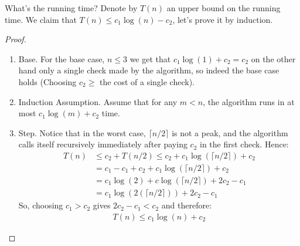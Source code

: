What's the running time? Denote by $T\left( n \right)$ an upper bound on the running time. We claim that $T(n) \le c_{1} \log (n) - c_{2}$, let's prove it by induction.
\begin{proof}
     
\begin{enumerate}
  \item Base. For the base case, $n \le 3$ we get that $c_{1} \log(1) + c_{2} =  c_{2}$ on the other hand only a single check made by the algorithm, so indeed the base case holds (Choosing $c_{2} \ge$ the cost of a single check).
  \item Induction Assumption. Assume that for any $m < n$, the algorithm runs in at most $c_{1} \log(m) + c_{2}$ time.
  \item Step. Notice that in the worst case, $\lceil n/2 \rceil$ is not a peak, and the algorithm calls itself recursively immediately after paying $c_{2}$ in the first check. Hence: \begin{equation*}
      \begin{split}    
	T\left(n\right) & \le c_{2} + T\left(n/2\right) \le c_{2} + c_{1} \log\left( \lceil n/2 \rceil \right) + c_{2}\\
	& = c_{1} - c_{1} + c_{2} + c_{1} \log\left( \lceil n/2 \rceil \right) + c_{2}\\
	& = c_{1} \log (2) +  c \log\left( \lceil n/2 \rceil  \right) + 2c_{2} - c_{1} \\
	& = c_{1} \log\left(2 \left(\lceil n/2 \rceil \right) \right) + 2c_{2} - c_{1}
      \end{split}
    \end{equation*}
    So, choosing $c_{1} > c_{2}$ gives $2c_{2} - c_{1} < c_{2}$ and therefore:
    \begin{equation*}
      \begin{split}
	T\left(n\right) \le c_{1} \log \left( n  \right) + c_{2}  
      \end{split}
    \end{equation*}
\end{enumerate}
\end{proof}


